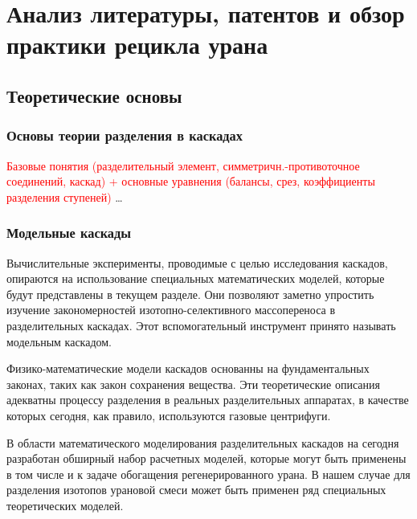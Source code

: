 \chapter{Анализ литературы, патентов и обзор практики рецикла урана}\label{ch:ch1}

\section{Теоретические основы}


\subsection{Основы теории разделения в каскадах}
\textcolor{red}{Базовые понятия (разделительный элемент, симметричн.-противоточное соединений, каскад) + основные уравнения (балансы, срез, коэффициенты разделения ступеней)}
\dots

\subsection{Модельные каскады}


Вычислительные эксперименты, проводимые с целью исследования каскадов, опираются на использование специальных математических моделей, которые будут представлены в текущем разделе. Они позволяют заметно упростить изучение закономерностей изотопно-селективного массопереноса в разделительных каскадах. Этот вспомогательный инструмент принято называть модельным каскадом.

Физико-математические модели каскадов основанны на фундаментальных законах, таких как закон сохранения вещества. Эти теоретические описания адекватны процессу разделения в реальных разделительных аппаратах, в качестве которых сегодня, как правило, используются газовые центрифуги.

В области математического моделирования разделительных каскадов на сегодня разработан обширный набор расчетных моделей, которые могут быть применены в том числе и к задаче обогащения регенерированного урана. В нашем случае для разделения изотопов урановой смеси может быть применен ряд специальных теоретических моделей.


